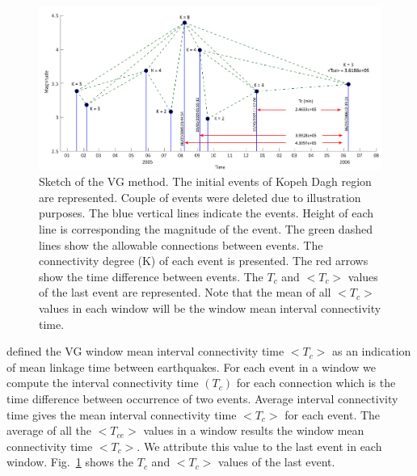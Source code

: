 \begin{figure} [ht]
\centering
\includegraphics[scale=0.24]{figures/pdf/Figure01.pdf} 
\caption{Sketch of the VG method. The initial events of Kopeh Dagh region are represented. Couple of events were deleted due to illustration purposes. The blue vertical lines indicate the events. Height of each line is corresponding the magnitude of the event. The green dashed lines show the allowable connections between events. The connectivity degree (K) of each event is presented. The red arrows show the time difference between events. The $T_c$ and $< T_c >$ values of the last event are represented. Note that the mean of all $<T_c>$ values in each window will be the window mean interval connectivity time.}
\label{fig:vg}
\end{figure}

\citet{Telesca2014} defined the VG window mean interval connectivity time $<T_c>$ as an indication of mean linkage time between earthquakes. For each event in a window we compute the interval connectivity time $(T_c)$ for each connection which is the time difference between occurrence of two events. Average interval connectivity time gives the mean interval connectivity time $<T_c>$  for each event. The average of all the $<T_{ce}>$ values in a window results the window mean connectivity time $<T_c>$. We attribute this value to the last event in each window. Fig.~\ref{fig:vg} shows the  $T_c$ and $< T_c >$ values of the last event. 